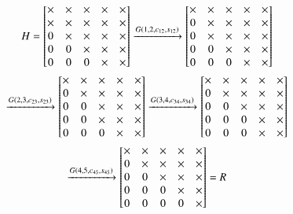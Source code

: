 \documentclass[journal]{IEEEtran}
\begin{document}
\begin{multline}
H = \begin{bmatrix}
\times & \times & \times & \times & \times\\
\times & \times & \times & \times & \times\\
0 & \times & \times & \times & \times\\
0 & 0 & \times & \times & \times\\
0 & 0 & 0 & \times & \times
\end{bmatrix} \xrightarrow{G\left(1, 2, c_{12}, s_{12}\right)}
\begin{bmatrix}
\times & \times & \times & \times & \times\\
0 & \times & \times & \times & \times\\
0 & \times & \times & \times & \times\\
0 & 0 & \times & \times & \times\\
0 & 0 & 0 & \times & \times
\end{bmatrix} \\\xrightarrow{G\left(2, 3, c_{23}, s_{23}\right)}
\begin{bmatrix}
\times & \times & \times & \times & \times\\
0 & \times & \times & \times & \times\\
0 & 0 & \times & \times & \times\\
0 & 0 & \times & \times & \times\\
0 & 0 & 0 & \times & \times
\end{bmatrix} \xrightarrow{G\left(3, 4, c_{34}, s_{34}\right)}
\begin{bmatrix}
\times & \times & \times & \times & \times\\
0 & \times & \times & \times & \times\\
0 & 0 & \times & \times & \times\\
0 & 0 & 0 & \times & \times\\
0 & 0 & 0 & \times & \times
\end{bmatrix} \\\xrightarrow{G\left(4, 5, c_{45}, s_{45}\right)}
\begin{bmatrix}
\times & \times & \times & \times & \times\\
0 & \times & \times & \times & \times\\
0 & 0 & \times & \times & \times\\
0 & 0 & 0 & \times & \times\\
0 & 0 & 0 & 0 & \times
\end{bmatrix} = R
\end{multline}
\end{document}
